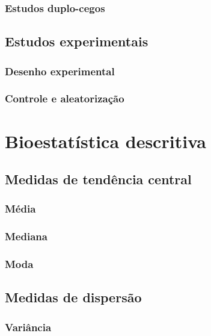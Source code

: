 \documentclass[
]{book}
\begin{document}
\subsection{Estudos duplo-cegos}\label{estudos-duplo-cegos}

\section{Estudos experimentais}\label{estudos-experimentais}

\subsection{Desenho experimental}\label{desenho-experimental}

\subsection{Controle e aleatorização}\label{controle-e-aleatorizauxe7uxe3o}

\chapter{Bioestatística descritiva}\label{bioestatuxedstica-descritiva}

\section{Medidas de tendência central}\label{medidas-de-tenduxeancia-central}

\subsection{Média}\label{muxe9dia}

\subsection{Mediana}\label{mediana}

\subsection{Moda}\label{moda}

\section{Medidas de dispersão}\label{medidas-de-dispersuxe3o}

\subsection{Variância}\label{variuxe2ncia}
\end{document}
